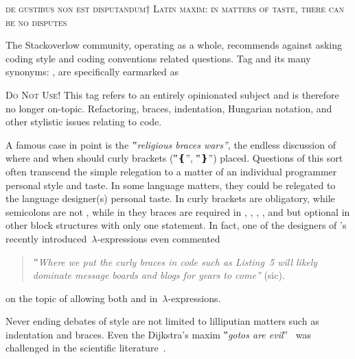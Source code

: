 \begin{flushright}
  \scriptsize
\textsc{de gustibus non est disputandum†{%
    Latin maxim: in matters of taste, there can be no disputes
}}
\end{flushright}
\vspace{-1ex}

The Stackoverlow community, operating as a whole,
recommends against asking coding style and coding conventions related
questions. Tag  and its many synonyms: ,
 are specifically
earmarked as

{\scriptsize
\begin{tcolorbox}[colback=green!5!white,colframe=blue!25!white,notitle]
  \textsc{Do Not Use!}
This tag refers to an entirely opinionated subject and is therefore
no longer on-topic. Refactoring, braces, indentation, Hungarian notation, and
other stylistic issues relating to code.
\end{tcolorbox}}

A famous case in point is the \emph{‟religious braces wars”}, the endless
discussion of where and when should curly brackets (‟\cc❴”, ‟\cc❵”) placed.
Questions of this sort often transcend the simple relegation to a matter of an
individual programmer personal style and taste. In some language matters, they
could be relegated to the language designer(s) personal taste. In \Go curly
brackets are obligatory, while semicolons are not%
, while in \Java they braces are
required in , , , , and
 but optional in other block structures with only one statement.
In fact, one of the designers of \Java's recently introduced~$λ$-expressions
even commented
\begin{quote}
  \footnotesize
\emph{‟Where we put the curly braces in code such as Listing~5 will likely
dominate \Java message boards and blogs for years to come”} (sic).
\end{quote}
on the topic of allowing both \mbox{} and \mbox{} in~$λ$-expressions.

Never ending debates of style are not limited to lilliputian matters such as
indentation and braces. Even the Dijkstra's maxim ‟\emph{gotos are
evil}”~\cite{Dijkstra:68} was challenged in the scientific
literature~\cite{Knuth:74,Ramshaw:88,Bochmann:73,Sennesh:Gil:16,Zoethout:79,Wulf:79,Clark:84}.

